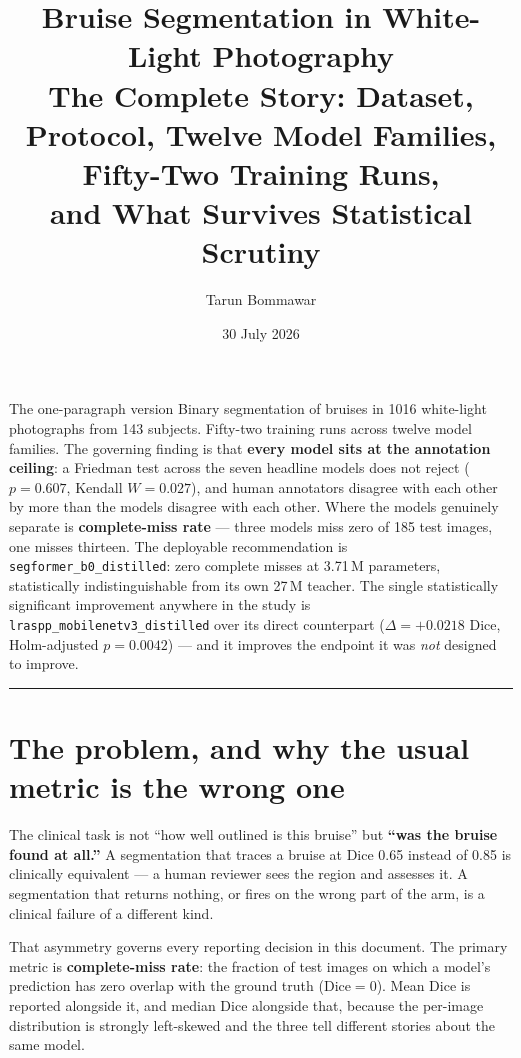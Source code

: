 \documentclass[11pt]{article}
\title{\vspace{-1.5cm}\color{secblue}\textbf{Bruise Segmentation in White-Light
Photography}\\[4pt]\large\color{black}The Complete Story: Dataset, Protocol,
Twelve Model Families, Fifty-Two Training Runs,\\ and What Survives Statistical
Scrutiny}
\author{Tarun Bommawar}
\date{30 July 2026}
\begin{document}
\maketitle
\thispagestyle{fancy}

\begin{keybox}{The one-paragraph version}
Binary segmentation of bruises in 1016 white-light photographs from 143
subjects. Fifty-two training runs across twelve model families. The governing
finding is that \textbf{every model sits at the annotation ceiling}: a Friedman
test across the seven headline models does not reject ($p=0.607$, Kendall
$W=0.027$), and human annotators disagree with each other by more than the
models disagree with each other. Where the models genuinely separate is
\textbf{complete-miss rate} --- three models miss zero of 185 test images, one
misses thirteen. The deployable recommendation is
\texttt{segformer\_b0\_distilled}: zero complete misses at 3.71\,M parameters,
statistically indistinguishable from its own 27\,M teacher. The single
statistically significant improvement anywhere in the study is
\texttt{lraspp\_mobilenetv3\_distilled} over its direct counterpart
($\Delta=+0.0218$ Dice, Holm-adjusted $p=0.0042$) --- and it improves the
endpoint it was \emph{not} designed to improve.
\end{keybox}

\tableofcontents
\vspace{6pt}\hrule\vspace{10pt}

\section{The problem, and why the usual metric is the wrong one}

The clinical task is not ``how well outlined is this bruise'' but \textbf{``was
the bruise found at all.''} A segmentation that traces a bruise at Dice 0.65
instead of 0.85 is clinically equivalent --- a human reviewer sees the region
and assesses it. A segmentation that returns nothing, or fires on the wrong part
of the arm, is a clinical failure of a different kind.

That asymmetry governs every reporting decision in this document. The primary
metric is \textbf{complete-miss rate}: the fraction of test images on which a
model's prediction has zero overlap with the ground truth ($\mathrm{Dice}=0$).
Mean Dice is reported alongside it, and median Dice alongside that, because the
per-image distribution is strongly left-skewed and the three tell different
stories about the same model.
\end{document}
